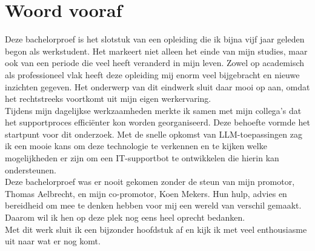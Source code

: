 
\chapter{Woord vooraf}
\label{ch:voorwoord}

Deze bachelorproef is het slotstuk van een opleiding die ik bijna vijf jaar geleden begon als werkstudent. Het markeert niet alleen het einde van mijn studies, maar ook van een periode die veel heeft veranderd in mijn leven. Zowel op academisch als professioneel vlak heeft deze opleiding mij enorm veel bijgebracht en nieuwe inzichten gegeven. Het onderwerp van dit eindwerk sluit daar mooi op aan, omdat het rechtstreeks voortkomt uit mijn eigen werkervaring.
\\[1em]
Tijdens mijn dagelijkse werkzaamheden merkte ik samen met mijn collega’s dat het supportproces efficiënter kon worden georganiseerd. Deze behoefte vormde het startpunt voor dit onderzoek. Met de snelle opkomst van LLM-toepassingen zag ik een mooie kans om deze technologie te verkennen en te kijken welke mogelijkheden er zijn om een IT-supportbot te ontwikkelen die hierin kan ondersteunen.
\\[1em]
Deze bachelorproef was er nooit gekomen zonder de steun van mijn promotor, Thomas Aelbrecht, en mijn co-promotor, Koen Mekers. Hun hulp, advies en bereidheid om mee te denken hebben voor mij een wereld van verschil gemaakt. Daarom wil ik hen op deze plek nog eens heel oprecht bedanken.
\\[1em]
Met dit werk sluit ik een bijzonder hoofdstuk af en kijk ik met veel enthousiasme uit naar wat er nog komt.




